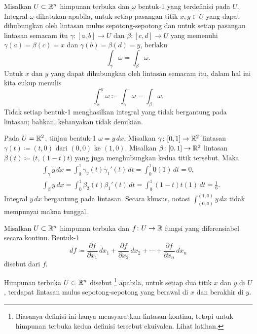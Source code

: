 Misalkan $U \subset {\mathbb{R}}^n$ himpunan terbuka dan $\omega$ bentuk-1 yang
terdefinisi pada $U$. Integral $\omega$ dikatakan
\emph{}
apabila, untuk setiap pasangan titik $x,y \in U$ yang dapat dihubungkan oleh
lintasan mulus sepotong-sepotong dan untuk setiap pasangan lintasan semacam itu
$\gamma \colon [a,b] \to U$ dan
$\beta \colon [c,d] \to U$ yang memenuhi $\gamma(a) = \beta(c) = x$
dan $\gamma(b) = \beta(d) = y$, berlaku
\begin{equation*}
\int_\gamma \omega = \int_\beta \omega .
\end{equation*}
Untuk $x$ dan $y$ yang dapat dihubungkan oleh lintasan semacam itu, dalam hal ini
kita cukup menulis
\begin{equation*}
\int_x^y \omega \coloneqq \int_\gamma \omega = \int_\beta \omega .
\end{equation*}
Tidak setiap bentuk-1 menghasilkan integral yang tidak bergantung pada lintasan;
bahkan, kebanyakan tidak demikian.

\begin{example}
Pada $U={\mathbb{R}}^2$, tinjau bentuk-1 $\omega=y\,dx$. Misalkan
$\gamma \colon [0,1] \to {\mathbb{R}}^2$ lintasan
$\gamma(t) \coloneqq (t,0)$ dari $(0,0)$ ke $(1,0)$. Misalkan
$\beta \colon [0,1] \to {\mathbb{R}}^2$ lintasan
$\beta(t) \coloneqq \bigl(t,(1-t)t\bigr)$ yang juga menghubungkan kedua titik
tersebut. Maka
\begin{align*}
& \int_\gamma y \, dx = 
\int_0^1 \gamma_2(t) \gamma_1'(t) \, dt
=
\int_0^1 0 (1) \, dt = 0 ,\\
& \int_\beta y \, dx = 
\int_0^1 \beta_2(t) \beta_1'(t) \, dt
=
\int_0^1 (1-t)t(1) \, dt = \frac{1}{6} .
\end{align*}
Integral $y\,dx$ bergantung pada lintasan. Secara khusus, notasi
$\int_{(0,0)}^{(1,0)} y\,dx$ tidak mempunyai makna tunggal.
\end{example}

\begin{defn}
Misalkan $U \subset {\mathbb{R}}^n$ himpunan terbuka dan $f \colon U \to {\mathbb{R}}$ fungsi
yang diferensiabel secara kontinu. Bentuk-1
\begin{equation*}
df \coloneqq
\frac{\partial f}{\partial x_1} \, dx_1 + 
\frac{\partial f}{\partial x_2} \, dx_2 + \cdots +
\frac{\partial f}{\partial x_n} \, dx_n 
\end{equation*}
disebut \emph{} dari $f$.

Himpunan terbuka $U \subset {\mathbb{R}}^n$ disebut
\emph{}%
\footnote{Biasanya definisi ini hanya mensyaratkan lintasan kontinu, tetapi
untuk himpunan terbuka kedua definisi tersebut ekuivalen. Lihat latihan.}
apabila, untuk setiap dua titik $x$ dan $y$ di $U$, terdapat lintasan mulus
sepotong-sepotong yang berawal di $x$ dan berakhir di $y$.
\end{defn}

